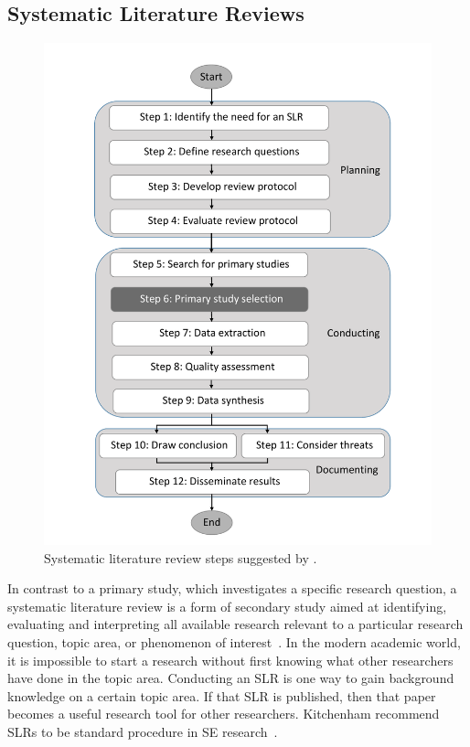 \documentclass[final,twocolumn,5p]{elsarticle}
\theoremstyle{break}
\begin{document}
\subsection{Systematic Literature Reviews}

\begin{figure}[ht]
    \centering
    \includegraphics[width=\linewidth]{procedure.pdf}
    \caption{Systematic literature review steps suggested by \cite{keele2007guidelines}.}
    \label{fig: slr}
\end{figure}

In contrast to a primary study, which investigates a specific research question,
a systematic literature review is a form of secondary study aimed at
identifying, evaluating and interpreting all available research relevant to a
particular research question, topic area, or phenomenon of
interest~\cite{keele2007guidelines}. In the modern academic world, it is
impossible to start a research without first knowing what other researchers have
done in the topic area. Conducting an SLR is one way to gain
background knowledge on a certain topic area.
If that SLR is published, then that paper becomes a useful research tool
for other researchers.  Kitchenham recommend SLRs to be standard
procedure in SE research~\cite{kitchenham2004evidence,keele2007guidelines}.
\end{document}
